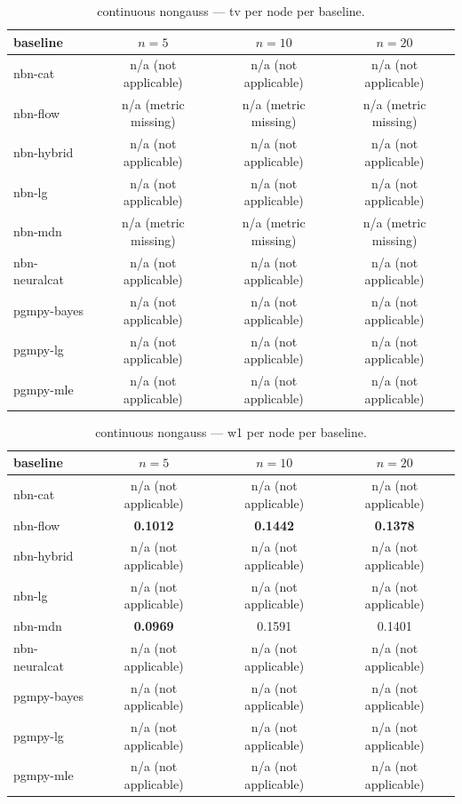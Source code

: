 \begin{table}[h]
\centering
\caption{continuous nongauss — tv per node per baseline.}
\label{tab:continuous_nongauss_tv_per_node}
\begin{tabular}{lccc}
\toprule
baseline & $n=5$ & $n=10$ & $n=20$ \\
\midrule
nbn-cat & n/a (not applicable) & n/a (not applicable) & n/a (not applicable) \\
nbn-flow & n/a (metric missing) & n/a (metric missing) & n/a (metric missing) \\
nbn-hybrid & n/a (not applicable) & n/a (not applicable) & n/a (not applicable) \\
nbn-lg & n/a (not applicable) & n/a (not applicable) & n/a (not applicable) \\
nbn-mdn & n/a (metric missing) & n/a (metric missing) & n/a (metric missing) \\
nbn-neuralcat & n/a (not applicable) & n/a (not applicable) & n/a (not applicable) \\
pgmpy-bayes & n/a (not applicable) & n/a (not applicable) & n/a (not applicable) \\
pgmpy-lg & n/a (not applicable) & n/a (not applicable) & n/a (not applicable) \\
pgmpy-mle & n/a (not applicable) & n/a (not applicable) & n/a (not applicable) \\
\bottomrule
\end{tabular}
\end{table}

\begin{table}[h]
\centering
\caption{continuous nongauss — w1 per node per baseline.}
\label{tab:continuous_nongauss_w1_per_node}
\begin{tabular}{lccc}
\toprule
baseline & $n=5$ & $n=10$ & $n=20$ \\
\midrule
nbn-cat & n/a (not applicable) & n/a (not applicable) & n/a (not applicable) \\
nbn-flow & \textbf{0.1012} & \textbf{0.1442} & \textbf{0.1378} \\
nbn-hybrid & n/a (not applicable) & n/a (not applicable) & n/a (not applicable) \\
nbn-lg & n/a (not applicable) & n/a (not applicable) & n/a (not applicable) \\
nbn-mdn & \textbf{0.0969} & 0.1591 & 0.1401 \\
nbn-neuralcat & n/a (not applicable) & n/a (not applicable) & n/a (not applicable) \\
pgmpy-bayes & n/a (not applicable) & n/a (not applicable) & n/a (not applicable) \\
pgmpy-lg & n/a (not applicable) & n/a (not applicable) & n/a (not applicable) \\
pgmpy-mle & n/a (not applicable) & n/a (not applicable) & n/a (not applicable) \\
\bottomrule
\end{tabular}
\end{table}

